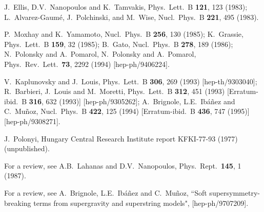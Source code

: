 \documentclass[12pt]{article}
\def\perspectives{in {\it Perspectives on Supersymmetry}, ed.
G.L.~Kane (World Scientific, 1998)}
\begin{document}
\begin{thebibliography}{999}
J.~Ellis, D.V.~Nanopoulos and K.~Tamvakis,
  Phys.\ Lett.\ B {\bf 121}, 123 (1983);
L.~Alvarez-Gaum\'e, J.~Polchinski, and M.~Wise,
  Nucl.\ Phys.\ B {\bf 221}, 495 (1983).

P.~Moxhay and K.~Yamamoto, 
  Nucl.\ Phys.\ B {\bf 256}, 130 (1985);
K.~Grassie, 
  Phys.\ Lett.\ B {\bf 159}, 32 (1985);
B.~Gato, 
  Nucl.\ Phys.\ B {\bf 278}, 189 (1986);
N.~Polonsky and A.~Pomarol, 
  N.~Polonsky and A.~Pomarol,
  Phys.\ Rev.\ Lett.\  {\bf 73}, 2292 (1994)
  [hep-ph/9406224].


V.~Kaplunovsky and J.~Louis, 
  Phys.\ Lett.\ B {\bf 306}, 269 (1993)
  [hep-th/9303040];
R.~Barbieri, J.~Louis and M.~Moretti, 
  Phys.\ Lett.\ B {\bf 312}, 451 (1993)
  [Erratum-ibid.\ B {\bf 316}, 632 (1993)]
  [hep-ph/9305262];
A.~Brignole, L.E.~Ib\'a\~nez and  C.~Mu\~noz,
  Nucl.\ Phys.\ B {\bf 422}, 125 (1994)
  [Erratum-ibid.\ B {\bf 436}, 747 (1995)]
  [hep-ph/9308271].

 J.~Polonyi, Hungary Central Research Institute
report KFKI-77-93 (1977) (unpublished). 

 For a review, see
A.B.~Lahanas and D.V.~Nanopoulos, 
  Phys.\ Rept.\  {\bf 145}, 1 (1987).

 For a review, see 
A.~Brignole, L.E.~Ib\'a\~nez and C.~Mu\~noz, 
  ``Soft supersymmetry-breaking terms from supergravity and superstring 
  models",
  [hep-ph/9707209].


\end{thebibliography}
\end{document}
